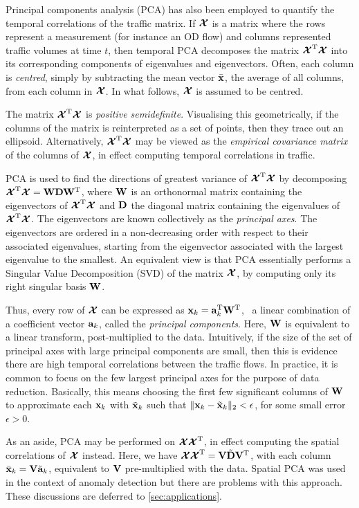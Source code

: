 Principal components analysis (PCA) has also been employed to quantify
the temporal correlations of the traffic matrix. If $\boldsymbol{\mathcal{X}}$ is a matrix
where the rows represent a measurement (for instance an OD flow) and
columns represented traffic volumes at time $t$, then temporal PCA
decomposes the matrix $\boldsymbol{\mathcal{X}}^{\mathrm{T}} \boldsymbol{\mathcal{X}}$ into its corresponding components
of eigenvalues and eigenvectors. Often, each column is \emph{centred}, simply by
subtracting the mean vector $\bar{\mathbf{x}}$, the average of all columns, from each 
column in $\boldsymbol{\mathcal{X}}$. In what follows, $\boldsymbol{\mathcal{X}}$ is assumed to be centred.

The matrix $\boldsymbol{\mathcal{X}}^{\mathrm{T}} \boldsymbol{\mathcal{X}}$ is \emph{positive
semidefinite}. Visualising this geometrically, if the columns of the matrix is reinterpreted
as a set of points, then they trace out an ellipsoid. Alternatively, $\boldsymbol{\mathcal{X}}^{\mathrm{T}} \boldsymbol{\mathcal{X}}$
may be viewed as the \emph{empirical covariance matrix} of the columns of
$\boldsymbol{\mathcal{X}}$, in effect computing temporal correlations in traffic. 

PCA is used to find the directions of greatest variance of $\boldsymbol{\mathcal{X}}^{\mathrm{T}} \boldsymbol{\mathcal{X}}$
by decomposing $\boldsymbol{\mathcal{X}}^{\mathrm{T}}\boldsymbol{\mathcal{X}} = \mathbf{W} \mathbf{D} \mathbf{W}^{\mathrm{T}}$, where $\mathbf{W}$ is an orthonormal matrix 
containing the eigenvectors of $\boldsymbol{\mathcal{X}}^{\mathrm{T}}\boldsymbol{\mathcal{X}}$ and $\mathbf{D}$ the diagonal 
matrix containing the eigenvalues of $\boldsymbol{\mathcal{X}}^{\mathrm{T}}\boldsymbol{\mathcal{X}}$. The eigenvectors
are known collectively as the \emph{principal axes}. The eigenvectors are ordered in a 
non-decreasing order with respect to their associated eigenvalues, starting from the
eigenvector associated with the largest eigenvalue to the smallest. An equivalent view
is that PCA essentially performs a Singular Value Decomposition (SVD) of the matrix
$\boldsymbol{\mathcal{X}}$, by computing only its right singular basis $\mathbf{W}$.

Thus, every row of $\boldsymbol{\mathcal{X}}$ can be expressed as $\mathbf{x}_k =  \mathbf{a}^{\mathrm{T}}_k \mathbf{W}^{\mathrm{T}}$, 
\ie~a linear combination of a coefficient vector
$\mathbf{a}_k$, called the \emph{principal components}. Here, $\mathbf{W}$ is equivalent to a linear
transform, post-multiplied to the data. Intuitively, if the size of the set of
principal axes with large principal components are small, then this is evidence
there are high temporal correlations between the traffic flows. In practice, it is
common to focus on the few largest principal axes for the purpose of data reduction.
Basically, this means choosing the first few significant columns of $\mathbf{W}$ to approximate each
$\mathbf{x}_k$ with $\tilde{\mathbf{x}}_k$ such that $\|\mathbf{x}_k - \tilde {\mathbf{x}}_k\|_2 < \epsilon$, for some 
small error $\epsilon > 0$.

As an aside, PCA may be performed on $\boldsymbol{\mathcal{X}}\boldsymbol{\mathcal{X}}^{\mathrm{T}}$, in effect computing the spatial
correlations of $\boldsymbol{\mathcal{X}}$ instead. Here, we have $\boldsymbol{\mathcal{X}}\boldsymbol{\mathcal{X}}^{\mathrm{T}} = \mathbf{V} \tilde{\mathbf{D}} \mathbf{V}^{\mathrm{T}}$, with
each column $\bar{\mathbf{x}}_k = \mathbf{V} \tilde {\mathbf{a}}_k$, equivalent to $\mathbf{V}$ pre-multiplied
with the data. Spatial PCA was used in the context of anomaly detection
\cite{Lakhina04Anomaly,Lakhina04Diagnosing,Lakhina05Mining} but there are problems
with this approach. These discussions are deferred to \autoref{sec:applications}.

